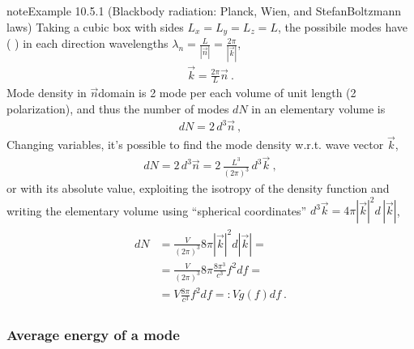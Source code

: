 \documentclass[letterpaper,10pt,english]{jupyterBook}
\begin{document}
\begin{sphinxadmonition}{note}{Example 10.5.1 (Black\sphinxhyphen{}body radiation: Planck, Wien, and Stefan\sphinxhyphen{}Boltzmann laws)}
\sphinxAtStartPar
Taking a cubic box with sides \(L_x = L_y = L_z = L\), the possibile modes have ( ) in each direction wave\sphinxhyphen{}lengths \(\lambda_n = \frac{L}{|\vec{n}|} = \frac{2 \pi}{|\vec{k}|}\),
\begin{equation*}
\begin{split}\vec{k} = \frac{2 \pi}{L} \vec{n} \ .\end{split}
\end{equation*}
\sphinxAtStartPar
Mode density in \(\vec{n}\)\sphinxhyphen{}domain is 2 mode per each volume of unit length (2 polarization), and thus the number of modes \(d N\) in an elementary volume is
\begin{equation*}
\begin{split}d N = 2 \, d^3 \vec{n} \ ,\end{split}
\end{equation*}
\sphinxAtStartPar
Changing variables, it’s possible to find the mode density w.r.t. wave vector \(\vec{k}\),
\begin{equation*}
\begin{split}d N = 2 \, d^3 \vec{n} = 2 \, \frac{L^3}{(2 \pi)^3} \, d^3 \vec{k} \ ,\end{split}
\end{equation*}
\sphinxAtStartPar
or with its absolute value, exploiting the isotropy of the density function \sphinxhyphen{} and writing the elementary volume using “spherical coordinates” \(d^3 \vec{k} = 4 \pi \left| \vec{k} \right|^2 d \, \left| \vec{k} \right|\),
\begin{equation*}
\begin{split}\begin{aligned}
  d N
  & = \frac{V}{(2 \pi)^3} 8 \pi \left| \vec{k} \right|^2 d \left| \vec{k} \right| = \\
  & = \frac{V}{(2 \pi)^3} 8 \pi \frac{8 \pi^3}{c^3} f^2 d f = \\
  & = V \frac{8 \pi}{c^3} f^2 df =: V g(f) df \ .
\end{aligned}\end{split}
\end{equation*}\subsubsection*{Average energy of a mode}


\end{sphinxadmonition}
\end{document}
